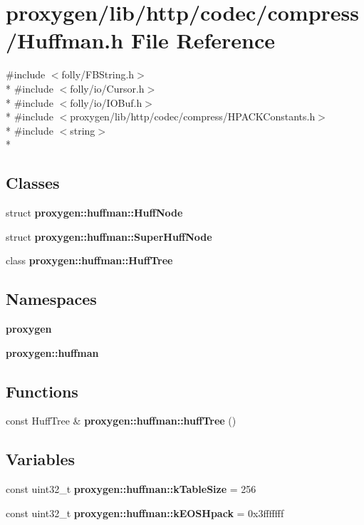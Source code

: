 \section{proxygen/lib/http/codec/compress/\+Huffman.h File Reference}
\label{Huffman_8h}
{\ttfamily \#include $<$folly/\+F\+B\+String.\+h$>$}\\*
{\ttfamily \#include $<$folly/io/\+Cursor.\+h$>$}\\*
{\ttfamily \#include $<$folly/io/\+I\+O\+Buf.\+h$>$}\\*
{\ttfamily \#include $<$proxygen/lib/http/codec/compress/\+H\+P\+A\+C\+K\+Constants.\+h$>$}\\*
{\ttfamily \#include $<$string$>$}\\*
\subsection*{Classes}
\begin{DoxyCompactItemize}
\item 
struct {\bf proxygen\+::huffman\+::\+Huff\+Node}
\item 
struct {\bf proxygen\+::huffman\+::\+Super\+Huff\+Node}
\item 
class {\bf proxygen\+::huffman\+::\+Huff\+Tree}
\end{DoxyCompactItemize}
\subsection*{Namespaces}
\begin{DoxyCompactItemize}
\item 
 {\bf proxygen}
\item 
 {\bf proxygen\+::huffman}
\end{DoxyCompactItemize}
\subsection*{Functions}
\begin{DoxyCompactItemize}
\item 
const Huff\+Tree \& {\bf proxygen\+::huffman\+::huff\+Tree} ()
\end{DoxyCompactItemize}
\subsection*{Variables}
\begin{DoxyCompactItemize}
\item 
const uint32\+\_\+t {\bf proxygen\+::huffman\+::k\+Table\+Size} = 256
\item 
const uint32\+\_\+t {\bf proxygen\+::huffman\+::k\+E\+O\+S\+Hpack} = 0x3fffffff
\end{DoxyCompactItemize}
